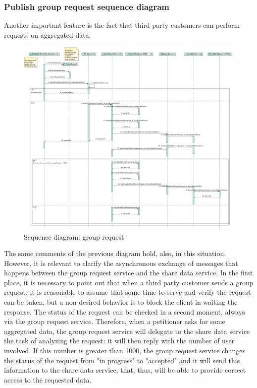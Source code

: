 \subsubsection{Publish group request sequence diagram}
Another important feature is the fact that third party customers can perform requests on aggregated data. \\


\begin{figure}[H]
\includegraphics[width=\linewidth]{Images/grouprequest.pdf}
\caption{ Sequence diagram: group request }
\label{fig:grouprequest}
\end{figure}

The same comments of the previous diagram hold, also, in this situation. 
However, it is relevant to clarify the asynchronous exchange of messages that happens between the group request service and the share data
service. 
In the first place, it is necessary to point out that when a third party customer sends a group request, it is reasonable to assume that 
some time to serve and verify the request can be taken, but a non-desired behavior is to block the client in waiting the response. The status
of the request can be checked in a second moment, always via the group request service. 
Therefore, when a petitioner asks for some aggregated data, the group request service will delegate to the share data service the task of 
analyzing the request: it will then reply with the number of user involved. If this number is greater than 1000, the group request service
changes the status of the request from "in progress" to "accepted" and it will send this information to the share data service, that, thus,
will be able to provide correct access to the requested data. \\

